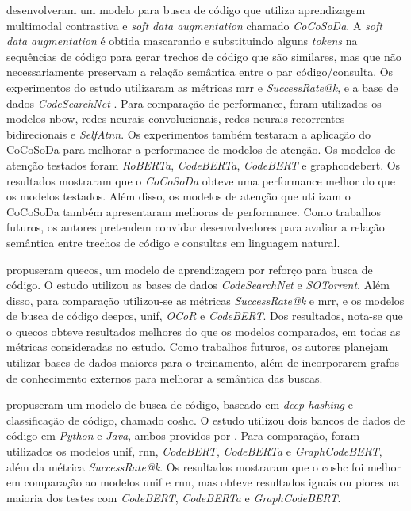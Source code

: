 \textcite{Shi2022EnhancingSC} desenvolveram um modelo para busca de código que utiliza aprendizagem multimodal contrastiva e \textit{soft data augmentation} chamado \textit{CoCoSoDa}. A \textit{soft data augmentation} é obtida mascarando e substituindo alguns \textit{tokens} na sequências de código para gerar trechos de código que são similares, mas que não necessariamente preservam a relação semântica entre o par código/consulta. Os experimentos do estudo utilizaram as métricas \gls{mrr} e \textit{SuccessRate@k}, e a base de dados \textit{CodeSearchNet} \cite{Husain2019CodeSearchNetCE}. Para comparação de performance, foram utilizados os modelos \gls{nbow}, redes neurais convolucionais, redes neurais recorrentes bidirecionais e \textit{SelfAtnn}. Os experimentos também testaram a aplicação do CoCoSoDa para melhorar a performance de modelos de atenção. Os modelos de atenção testados foram \textit{RoBERTa}, \textit{CodeBERTa},
\textit{CodeBERT} e \gls{graphcodebert}. Os resultados mostraram que o \textit{CoCoSoDa} obteve uma performance melhor do que os modelos testados. Além disso, os modelos de atenção que utilizam o CoCoSoDa também apresentaram melhoras de performance. Como trabalhos futuros, os autores pretendem convidar desenvolvedores para avaliar a relação semântica entre trechos de código e consultas em linguagem natural.

\textcite{Wang2022EnrichingQS} propuseram \gls{quecos}, um modelo de aprendizagem por reforço para busca de código. O estudo utilizou as bases de dados \textit{CodeSearchNet} \cite{Husain2019CodeSearchNetCE} e \textit{SOTorrent}. Além disso, para comparação utilizou-se as métricas \textit{SuccessRate@k} e \gls{mrr}, e os modelos de busca de código \gls{deepcs}, \gls{unif}, \textit{OCoR} e \textit{CodeBERT}. Dos resultados, nota-se que o \gls{quecos} obteve resultados melhores do que os modelos comparados, em todas as métricas consideradas no estudo. Como trabalhos futuros, os autores planejam utilizar bases de dados maiores para o treinamento, além de incorporarem grafos de conhecimento externos para melhorar a semântica das buscas.

\textcite{Gu2022AcceleratingCS} propuseram um modelo de busca de código, baseado em \textit{deep hashing} e classificação de código, chamado \gls{coshc}. O estudo utilizou dois bancos de dados de código em \textit{Python} e \textit{Java}, ambos providos por \cite{Feng2020CodeBERTAP}. Para comparação, foram utilizados os modelos \gls{unif}, \gls{rnn}, \textit{CodeBERT}, \textit{CodeBERTa} e \textit{GraphCodeBERT}, além da métrica \textit{SuccessRate@k}. Os resultados mostraram que o \gls{coshc} foi melhor em comparação ao modelos \gls{unif} e \gls{rnn}, mas obteve resultados iguais ou piores na maioria dos testes com \textit{CodeBERT}, \textit{CodeBERTa} e \textit{GraphCodeBERT}.

